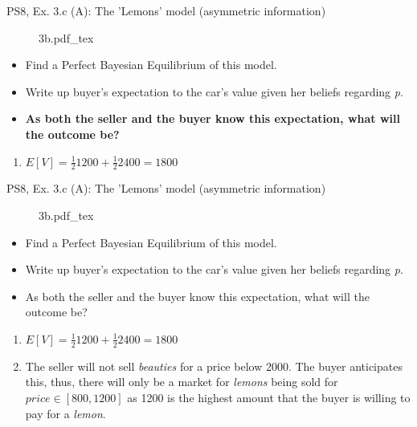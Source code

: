 \begin{frame}{PS8, Ex. 3.c (A): The 'Lemons' model (asymmetric information)}
    \begin{figure}[!h]
      \center
      \def\svgwidth{.8\columnwidth}
      {3b.pdf_tex}
    \end{figure}
    \vspace{-8pt}
    \begin{itemize}
      \item[(c)] Find a Perfect Bayesian Equilibrium of this model.
    \end{itemize}
    \vspace{-12pt}
    \begin{multicols}{2}
      \begin{itemize}
        \item[Step 1:] Write up buyer's expectation to the car's value given her beliefs regarding \textit{p}.
        \item[Step 2:] \textbf{As both the seller and the buyer know this expectation, what will the outcome be?}
      \end{itemize}
      \vfill\null\columnbreak
      \begin{enumerate}
        \item $E[V]=\frac{1}{2}1200+\frac{1}{2}2400=1800$
      \end{enumerate}
      \vfill\null
    \end{multicols}
\end{frame}
\begin{frame}{PS8, Ex. 3.c (A): The 'Lemons' model (asymmetric information)}
    \begin{figure}[!h]
      \center
      \def\svgwidth{.8\columnwidth}
      {3b.pdf_tex}
    \end{figure}
    \vspace{-8pt}
    \begin{itemize}
      \item[(c)] Find a Perfect Bayesian Equilibrium of this model.
    \end{itemize}
    \vspace{-12pt}
    \begin{multicols}{2}
      \begin{itemize}
        \item[Step 1:] Write up buyer's expectation to the car's value given her beliefs regarding \textit{p}.
        \item[Step 2:] As both the seller and the buyer know this expectation, what will the outcome be?
      \end{itemize}
      \vfill\null\columnbreak
      \begin{enumerate}
        \item $E[V]=\frac{1}{2}1200+\frac{1}{2}2400=1800$
        \item The seller will not sell \textit{beauties} for a price below 2000. The buyer anticipates this, thus, there will only be a market for \textit{lemons} being sold for $price\in[800,1200]$ as 1200 is the highest amount that the buyer is willing to pay for a \textit{lemon}.
      \end{enumerate}
      \vfill\null
    \end{multicols}
\end{frame}
